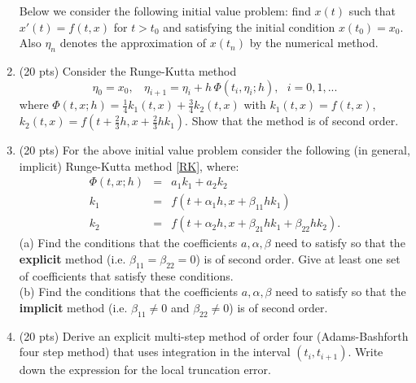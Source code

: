 \begin{enumerate}
\bigskip
\noindent
Below we consider the following initial value problem: find $x(t)$ such that 
$x'(t)=f(t,x)$ for $t > t_0$ and satisfying the initial condition $x(t_0)=x_0$.
Also $\eta_n$ denotes the approximation of $x(t_n)$ by the numerical method.
\bigskip
\noindent

\item (20 pts) Consider the Runge-Kutta method 
\begin{equation}\label{RK}
\eta_0=x_0, ~~~~\eta_{i+1}= \eta_i + h \, \Phi(t_i,\eta_i;h), ~~~i=0,1,...
\end{equation}
where
$ \displaystyle \Phi(t,x;h)= \frac14 k_1(t,x) + \frac34k_2(t,x)$
with
$ k_1(t,x)=  f(t,x) $,
$ k_2(t,x) =  f(t+ \frac{2}{3}h, x+ \frac{2}{3} h k_1).$
Show that the method is of second  order.

\item (20 pts) For the above initial value problem 
consider the following (in general, implicit) 
Runge-Kutta method \eqref{RK}, where:
\begin{equation}\label{Taylor-1}
\begin{array}{rll}
 \Phi(t,x;h)& = & a_1 k_1 + a_2k_2 \\[1ex]
        k_1 & = & f(t+ \alpha_1 h, x + \beta_{11} h k_1)\\[1ex]
        k_2 & = & f(t+ \alpha_2 h, x + \beta_{21} h k_1 + \beta_{22}h k_2).
\end{array}
\end{equation}
(a) Find the conditions that the coefficients $a, \alpha, \beta $ need 
to satisfy so that the {\bf explicit} 
method (i.e. $\beta_{11} = \beta_{22}=0$) is of second order. 
Give at least one set of coefficients that satisfy these conditions.\\
(b) Find the conditions that the coefficients $a, \alpha, \beta $ need 
to satisfy so that the {\bf implicit} 
method (i.e. $\beta_{11} \not= 0$ and $\beta_{22} \not= 0$) is of second order.

\item  (20 pts)  
Derive an explicit multi-step method of order four (Adams-Bashforth four step
method) that uses integration in the interval $(t_i,t_{i+1})$. Write down the expression
for the local truncation error.

\end{enumerate}
 
 
 
 

 